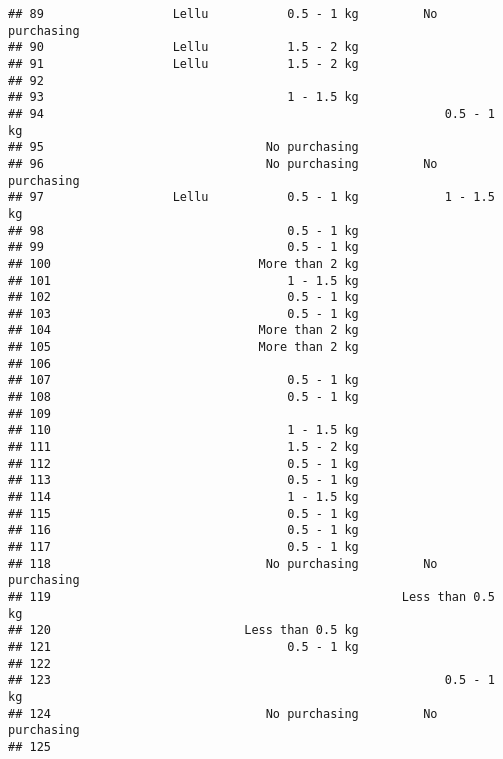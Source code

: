 \documentclass[
]{article}
\begin{document}
\begin{verbatim}
## 89                  Lellu           0.5 - 1 kg         No purchasing
## 90                  Lellu           1.5 - 2 kg                      
## 91                  Lellu           1.5 - 2 kg                      
## 92                                                                  
## 93                                  1 - 1.5 kg                      
## 94                                                        0.5 - 1 kg
## 95                               No purchasing                      
## 96                               No purchasing         No purchasing
## 97                  Lellu           0.5 - 1 kg            1 - 1.5 kg
## 98                                  0.5 - 1 kg                      
## 99                                  0.5 - 1 kg                      
## 100                             More than 2 kg                      
## 101                                 1 - 1.5 kg                      
## 102                                 0.5 - 1 kg                      
## 103                                 0.5 - 1 kg                      
## 104                             More than 2 kg                      
## 105                             More than 2 kg                      
## 106                                                                 
## 107                                 0.5 - 1 kg                      
## 108                                 0.5 - 1 kg                      
## 109                                                                 
## 110                                 1 - 1.5 kg                      
## 111                                 1.5 - 2 kg                      
## 112                                 0.5 - 1 kg                      
## 113                                 0.5 - 1 kg                      
## 114                                 1 - 1.5 kg                      
## 115                                 0.5 - 1 kg                      
## 116                                 0.5 - 1 kg                      
## 117                                 0.5 - 1 kg                      
## 118                              No purchasing         No purchasing
## 119                                                 Less than 0.5 kg
## 120                           Less than 0.5 kg                      
## 121                                 0.5 - 1 kg                      
## 122                                                                 
## 123                                                       0.5 - 1 kg
## 124                              No purchasing         No purchasing
## 125                                                                 

\end{verbatim}
\end{document}

